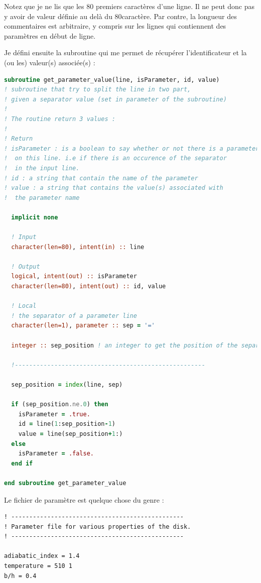 \documentclass[a4paper,twoside]{article}
\begin{document}
\begin{attention}
Notez que je ne lis que les 80 premiers caractères d'une ligne. Il ne peut donc pas y avoir de valeur définie au delà du 80\ieme caractère. Par contre, la longueur des commentaires est arbitraire, y compris sur les lignes qui contiennent des paramètres en début de ligne.
\end{attention}


Je défini ensuite la subroutine qui me permet de récupérer l'identificateur et la (ou les) valeur(s) associée(s) : 
\begin{lstlisting}[language=Fortran]
subroutine get_parameter_value(line, isParameter, id, value)
! subroutine that try to split the line in two part, 
! given a separator value (set in parameter of the subroutine)
!
! The routine return 3 values : 
!
! Return
! isParameter : is a boolean to say whether or not there is a parameter 
!  on this line. i.e if there is an occurence of the separator 
!  in the input line.
! id : a string that contain the name of the parameter
! value : a string that contains the value(s) associated with 
!  the parameter name

  implicit none
  
  ! Input
  character(len=80), intent(in) :: line
  
  ! Output
  logical, intent(out) :: isParameter
  character(len=80), intent(out) :: id, value
  
  ! Local
  ! the separator of a parameter line
  character(len=1), parameter :: sep = '=' 

  integer :: sep_position ! an integer to get the position of the separator

  !-----------------------------------------------------

  sep_position = index(line, sep)
  
  if (sep_position.ne.0) then
    isParameter = .true.
    id = line(1:sep_position-1)
    value = line(sep_position+1:)
  else
    isParameter = .false.
  end if

end subroutine get_parameter_value
\end{lstlisting}

Le fichier de paramètre est quelque chose du genre :
\begin{verbatim}
! ------------------------------------------------
! Parameter file for various properties of the disk. 
! ------------------------------------------------

adiabatic_index = 1.4
temperature = 510 1
b/h = 0.4
\end{verbatim}
\end{document}
